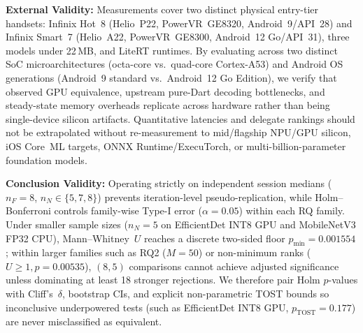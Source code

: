 \textbf{External Validity:} Measurements cover two distinct physical entry-tier handsets: Infinix Hot~8 (Helio~P22, PowerVR~GE8320, Android~9/API~28) and Infinix Smart~7 (Helio~A22, PowerVR~GE8300, Android~12 Go/API~31), three models under 22\,MB, and LiteRT runtimes. By evaluating across two distinct SoC microarchitectures (octa-core vs.\ quad-core Cortex-A53) and Android OS generations (Android~9 standard vs.\ Android~12 Go Edition), we verify that observed GPU equivalence, upstream pure-Dart decoding bottlenecks, and steady-state memory overheads replicate across hardware rather than being single-device silicon artifacts. Quantitative latencies and delegate rankings should not be extrapolated without re-measurement to mid/flagship NPU/GPU silicon, iOS Core~ML targets, ONNX Runtime/ExecuTorch, or multi-billion-parameter foundation models.

\textbf{Conclusion Validity:} Operating strictly on independent session medians ($n_F=8$, $n_N \in \{5,7,8\}$) prevents iteration-level pseudo-replication, while Holm--Bonferroni controls family-wise Type-I error ($\alpha=0.05$) within each RQ family. Under smaller sample sizes ($n_N=5$ on EfficientDet INT8 GPU and MobileNetV3 FP32 CPU), Mann--Whitney~$U$ reaches a discrete two-sided floor $p_{\min}=0.001554$; within larger families such as RQ2 ($M=50$) or non-minimum ranks ($U \ge 1, p=0.00535$), $(8,5)$ comparisons cannot achieve adjusted significance unless dominating at least 18 stronger rejections. We therefore pair Holm $p$-values with Cliff's~$\delta$, bootstrap CIs, and explicit non-parametric TOST bounds so inconclusive underpowered tests (such as EfficientDet INT8 GPU, $p_{\mathrm{TOST}}=0.177$) are never misclassified as equivalent.
